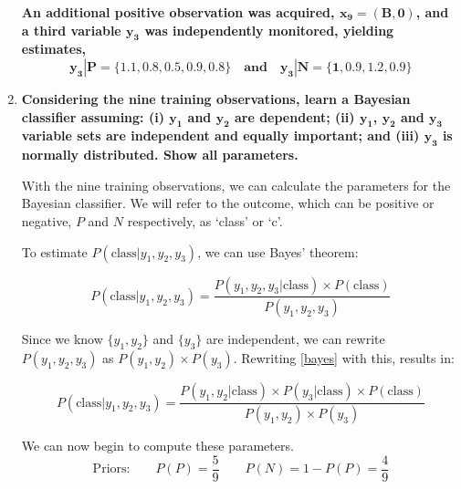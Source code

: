 \documentclass[12pt]{article}
\begin{document}
\begin{enumerate}[leftmargin=\labelsep]
    \vspace{15pt}
    \textbf{An additional positive observation was acquired, $\boldsymbol{x_9 = (B,0)}$, and a third variable $\boldsymbol{y_3}$
    was independently monitored, yielding estimates,}
    \[
    \boldsymbol{y_3|P = \{1.1, 0.8, 0.5, 0.9, 0.8\} \quad and \quad y_3|N = \{1, 0.9, 1.2, 0.9\}}
    \]

    \item \textbf{Considering the nine training observations, learn a Bayesian classifier assuming:
    (i) $\boldsymbol{y_1}$ and $\boldsymbol{y_2}$ are dependent; (ii) {$\boldsymbol{y_1}$, $\boldsymbol{y_2}$} and {$\boldsymbol{y_3}$} variable sets are independent and equally
    important; and (iii) $\boldsymbol{y_3}$ is normally distributed. Show all parameters.}

    \vspace{10pt} 
    With the nine training observations, we can calculate the parameters for the Bayesian classifier.
    We will refer to the outcome, which can be positive or negative, $P$ and $N$ respectively, as `class' or `c'.

    \vspace{10pt} 
    To estimate $P(\text{class} | y_1, y_2, y_3)$, we can use Bayes' theorem:

    \begin{equation}\label{bayes}
        P(\text{class}| y_1, y_2, y_3) = \frac{P(y_1, y_2, y_3 | \text{class}) \times P(\text{class})}{P(y_1, y_2, y_3)}
    \end{equation}

    Since we know $\{y_1, y_2\}$ and $\{y_3\}$ are independent,
    we can rewrite $P(y_1, y_2, y_3)$ as $P(y_1, y_2) \times P(y_3)$.
    Rewriting \eqref{bayes} with this, results in:

    \begin{equation}\label{bayes2}
        P(\text{class}| y_1, y_2, y_3) = \frac{P(y_1, y_2 | \text{class}) \times P(y_3 | \text{class}) \times P(\text{class})}{P(y_1, y_2) \times P(y_3)}
    \end{equation}

    \vspace{10pt}
    We can now begin to compute these parameters.
    \vspace{10pt}
    \begin{equation*}
        \text{Priors:} \qquad
        P(P) = \frac{5}{9} \quad \quad P(N) = 1- P(P) = \frac{4}{9} 
    \end{equation*}


\end{enumerate}
\end{document}
